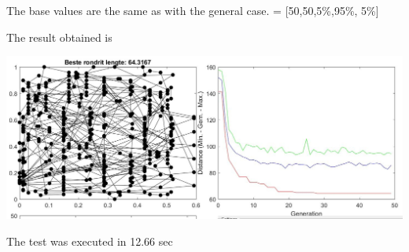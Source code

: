 The base values are the same as with the general case.
 = [50,50,5\%,95\%, 5\%\big]

The result obtained is

\includegraphics[width=\textwidth]{img/specific/xalt_edges/general_1.jpg}

The test was executed in 12.66 sec

